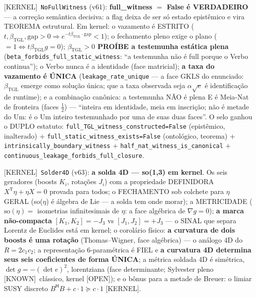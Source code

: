 \documentclass[11pt]{article}
\providecommand{\kernelmk}[1]{\textsf{[KERNEL]}~\texttt{#1}}\providecommand{\knownmk}[1]{\textsf{[KNOWN]}~{#1}}\providecommand{\statusmk}[1]{\textsf{[#1]}}
\newcommand{\bTGL}{\beta_{\mathrm{TGL}}}\newcommand{\Msun}{M_{\odot}}\newcommand{\TGL}{\mathrm{TGL}}
\theoremstyle{definition}\newtheorem{deriv}{Derivação}
\begin{document}
\kernelmk{NoFullWitness} (v61): \textbf{full\_witness $=$ False é VERDADEIRO} --- a correção semântica decisiva: a flag deixa de ser só estado epistêmico e vira TEOREMA estrutural. Em kernel: o vazamento é ESTRITO ($t,\bTGL,\mathrm{gap}>0\Rightarrow e^{-t\bTGL\cdot\mathrm{gap}}<1$); o fechamento pleno exige o plano ($=1\iff t\bTGL g=0$); \textbf{$\bTGL>0$ PROÍBE a testemunha estática plena} (\texttt{beta\_forbids\_full\_static\_witness}: ``a testemunha não é full porque o Verbo continua''); o Verbo nunca é a identidade (face matricial); \textbf{a taxa do vazamento é ÚNICA} (\texttt{leakage\_rate\_unique} --- a face GKLS do enunciado: $\bTGL$ emerge como solução única; que a taxa observada seja $\alpha\sqrt e$ é identificação de runtime); e a combinação canônica: a testemunha NÃO é plena E é Meia-Nat de fronteira (faces $\tfrac12$) --- ``inteira em identidade, meia em inscrição; não é metade do Um: é o Um inteiro testemunhado por uma de suas duas faces''. O selo ganhou o DUPLO estatuto: \texttt{full\_TGL\_witness\_constructed=False} (epistêmico, inalterado) $+$ \texttt{full\_static\_witness\_exists=False} (ontológico, teorema) $+$ \texttt{intrinsically\_boundary\_witness} $+$ \texttt{half\_nat\_witness\_is\_canonical} $+$ \texttt{continuous\_leakage\_forbids\_full\_closure}.

\kernelmk{Solder4D} (v63): \textbf{a solda 4D --- so(1,3) em kernel}. Os seis geradores (boosts $K_i$, rotações $J_i$) com a propriedade DEFINIDORA $X^\mathsf{T}\eta+\eta X=0$ provada para todos; o FECHAMENTO sob colchete para $\eta$ GERAL (so($\eta$) é álgebra de Lie --- a solda tem onde morar); a METRICIDADE ($\mathrm{so}(\eta)=$ isometrias infinitesimais de $\eta$: a face algébrica de $\nabla g=0$); \textbf{a marca não-compacta} $[K_1,K_2]=-J_3$ vs $[J_1,J_2]=+J_3$ --- o SINAL que separa Lorentz de Euclides está em kernel; o corolário físico: \textbf{a curvatura de dois boosts é uma rotação} (Thomas--Wigner, face algébrica) --- o análogo 4D do $R=2c_1c_2$; a representação 6-paramétrica é FIEL e \textbf{a curvatura 4D determina seus seis coeficientes de forma ÚNICA}; a métrica soldada 4D é simétrica, $\det g=-(\det e)^2$, lorentziana (face determinante; Sylvester pleno \knownmk{clássico}, kernel \statusmk{OPEN}); e o bônus para a metade de Breuer: o limiar SUSY discreto $B^\mathsf{H}B+c\cdot1\succeq c\cdot1$ [KERNEL].
\end{document}
